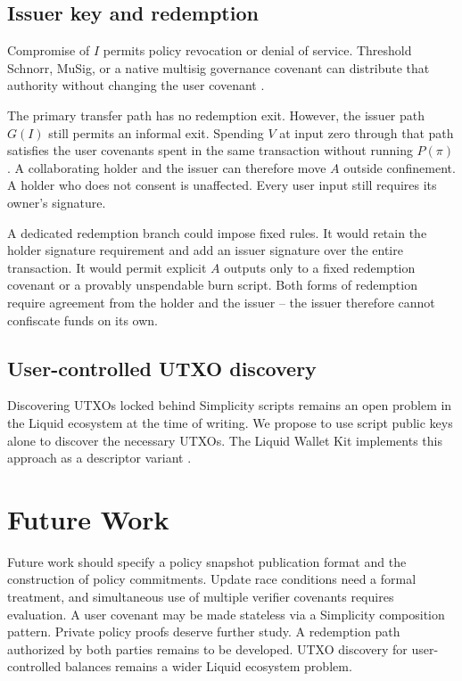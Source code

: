 \documentclass[11pt]{article}
\begin{document}
    \subsection{Issuer key and redemption}

    Compromise of $I$ permits policy revocation or denial of service.
    Threshold Schnorr, MuSig, or a native multisig governance covenant can distribute that authority without changing the user covenant \cite{programmable-signatures}.

    The primary transfer path has no redemption exit.
    However, the issuer path $G(I)$ still permits an informal exit.
    Spending $V$ at input zero through that path satisfies the user covenants spent in the same transaction without running $P(\pi)$.
    A collaborating holder and the issuer can therefore move $A$ outside confinement.
    A holder who does not consent is unaffected.
    Every user input still requires its owner's signature.

    A dedicated redemption branch could impose fixed rules.
    It would retain the holder signature requirement and add an issuer signature over the entire transaction.
    It would permit explicit $A$ outputs only to a fixed redemption covenant or a provably unspendable burn script.
    Both forms of redemption require agreement from the holder and the issuer -- the issuer therefore cannot confiscate funds on its own.

    \subsection{User-controlled UTXO discovery}

    Discovering UTXOs locked behind Simplicity scripts remains an open problem in the Liquid ecosystem at the time of writing.
    We propose to use script public keys alone to discover the necessary UTXOs.
    The Liquid Wallet Kit implements this approach as a descriptor variant \cite{lwk-spk-descriptor}.


    \section{Future Work}

    Future work should specify a policy snapshot publication format and the construction of policy commitments.
    Update race conditions need a formal treatment, and simultaneous use of multiple verifier covenants requires evaluation.
    A user covenant may be made stateless via a Simplicity composition pattern.
    Private policy proofs deserve further study.
    A redemption path authorized by both parties remains to be developed.
    UTXO discovery for user-controlled balances remains a wider Liquid ecosystem problem.
\end{document}
